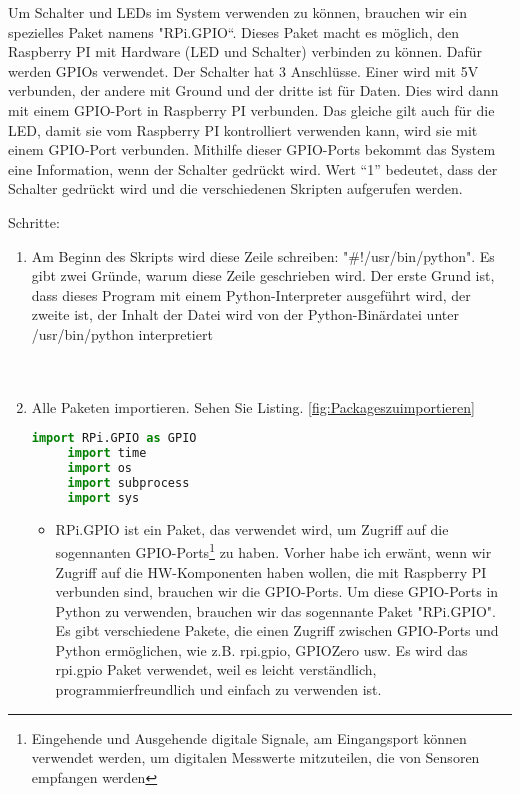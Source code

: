 Um Schalter und LEDs im System verwenden zu k\"onnen, brauchen wir ein spezielles Paket namens "RPi.GPIO“. Dieses Paket macht es m\"oglich, den Raspberry PI mit Hardware (LED und Schalter) verbinden zu k\"onnen. Daf\"ur werden GPIOs verwendet. Der Schalter hat 3 Anschl\"usse. Einer wird mit 5V verbunden, der andere mit Ground und der dritte ist f\"ur Daten. Dies wird dann mit einem GPIO-Port in Raspberry PI verbunden. Das gleiche gilt auch f\"ur die LED, damit sie vom Raspberry PI kontrolliert verwenden kann, wird sie mit einem GPIO-Port verbunden. Mithilfe dieser GPIO-Ports bekommt das System eine Information, wenn der Schalter gedr\"uckt wird. Wert ``1'' bedeutet, dass der Schalter gedr\"uckt wird und die verschiedenen Skripten aufgerufen werden. 

Schritte: 
\begin{enumerate}
	
	\item Am Beginn des Skripts wird diese Zeile schreiben: "\#!/usr/bin/python". Es gibt zwei Gr\"unde, warum diese Zeile geschrieben wird. Der erste Grund ist, dass dieses Program mit einem Python-Interpreter ausgef\"uhrt wird, der zweite ist, der Inhalt der Datei wird von der Python-Binärdatei unter /usr/bin/python interpretiert \\ \\ \\ 
	 \item Alle Paketen importieren. Sehen Sie Listing. \ref{fig:Packageszuimportieren} 
	 \begin{lstlisting}[caption={Packages zu importieren},label={fig:Packageszuimportieren},language=Python]
	 import RPi.GPIO as GPIO
	 import time
	 import os
	 import subprocess
	 import sys
	 \end{lstlisting}
	 \begin{itemize}
	 	
	 \item RPi.GPIO ist ein Paket, das verwendet wird, um Zugriff auf die sogennanten GPIO-Ports\footnote{Eingehende und Ausgehende digitale Signale, am Eingangsport k\"onnen verwendet werden, um  digitalen Messwerte mitzuteilen, die von Sensoren empfangen werden} zu haben. Vorher habe ich erw\"ant, wenn wir Zugriff auf die HW-Komponenten haben wollen, die mit Raspberry PI verbunden sind, brauchen wir die GPIO-Ports. Um diese GPIO-Ports in Python zu verwenden, brauchen wir das sogennante Paket "RPi.GPIO". Es gibt verschiedene Pakete, die einen Zugriff zwischen GPIO-Ports und Python erm\"oglichen, wie z.B. rpi.gpio, GPIOZero usw. Es wird das rpi.gpio Paket verwendet, weil es leicht verst\"andlich, programmierfreundlich und einfach zu verwenden ist. \cite{rpigpio}
	 

\end{itemize}
\end{enumerate}
